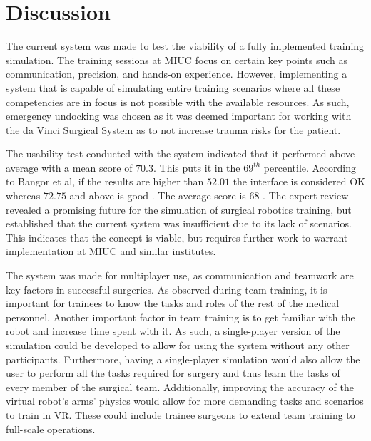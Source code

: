 \section{Discussion}
The current system was made to test the viability of a fully implemented training simulation. The training sessions at MIUC focus on certain key points such as communication, precision, and hands-on experience. However, implementing a system that is capable of simulating entire training scenarios where all these competencies are in focus is not possible with the available resources. As such, emergency undocking was chosen as it was deemed important for working with the da Vinci Surgical System as to not increase trauma risks for the patient.

The usability test conducted with the system indicated that it performed above average with a mean score of $70.3$. This puts it in the $69^{th}$ percentile. According to Bangor et al, if the results are higher than $52.01$ the interface is considered OK whereas $72.75$ and above is good \citep{bangor_empirical_2008}. The average score is 68 \citep{sauro_sustisfied?_nodate}. The expert review revealed a promising future for the simulation of surgical robotics training, but established that the current system was insufficient due to its lack of scenarios. This indicates that the concept is viable, but requires further work to warrant implementation at MIUC and similar institutes.

The system was made for multiplayer use, as communication and teamwork are key factors in successful surgeries. As observed during team training, it is important for trainees to know the tasks and roles of the rest of the medical personnel. Another important factor in team training is to get familiar with the robot and increase time spent with it. As such, a single-player version of the simulation could be developed to allow for using the system without any other participants. Furthermore, having a single-player simulation would also allow the user to perform all the tasks required for surgery and thus learn the tasks of every member of the surgical team. Additionally, improving the accuracy of the virtual robot's arms' physics would allow for more demanding tasks and scenarios to train in VR. These could include trainee surgeons to extend team training to full-scale operations.

